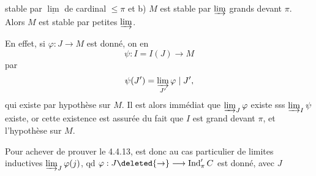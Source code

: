 stable par $\underline{\lim}$ de cardinal $\leq\pi$ et b) $M$ est stable par $\varinjlim$  grands devant $\pi$. Alors $M$ est stable par petites $\varinjlim$.


En effet, si $\varphi:J\longrightarrow M$ est donné, on en 
\[
\psi:I=I(J)\longrightarrow M
\]
par
\[
\psi(J')=\varinjlim_{J'}\varphi\mid J',
\]
qui existe par hypothèse sur $M$. Il est alors immédiat que $\varinjlim_J\varphi$ existe sss $\varinjlim_I\psi$ existe, or cette existence est assurée du fait que $I$ est grand devant $\pi$, et l'hypothèse sur $M$.

Pour achever de prouver le  4.4.13,  est donc  au cas particulier de limites inductives $\varinjlim_J\varphi(j)$, qd $\varphi:J\deleted{\to}\longrightarrow\operatorname{Ind}'_\pi C$ est donné, avec $J$ 
